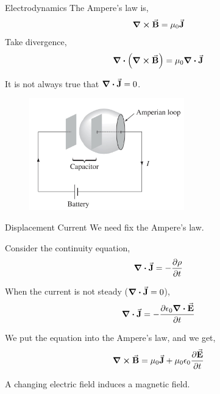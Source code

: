 \documentclass{beamer}
\begin{document}
\begin{frame}{Electrodynamics}
    The Ampere's law is,
    \begin{equation}
        \curl{\va{B}} = \mu_0 \va{J}
    \end{equation}
    Take divergence,
    \begin{equation}
        \div{\left( \curl{\va{B}} \right)} = \mu_0\div{\va{J}}
    \end{equation}

    It is not always true that $\div{\va{J}} = 0$.

    \begin{figure}[htbp]
        \centering
        \includegraphics[width=0.6\textwidth]{Images/amp.jpg}
    \end{figure}
\end{frame}

\begin{frame}{Displacement Current}
    We need fix the Ampere's law.

    Consider the continuity equation,
    \begin{equation}
        \div{\va{J}} = -\pdv{\rho}{t}
    \end{equation}

    When the current is not steady ($\div{\va{J}} = 0$),
    \begin{equation}
        \div{\va{J}} = -\pdv{\epsilon_0 \div{\va{E}}}{t}
    \end{equation}

    We put the equation into the Ampere's law, and we get,
    \begin{equation}
        \curl{\va{B}} = \mu_0 \va{J} + \mu_0 \epsilon_0\pdv{\va{E}}{t}
    \end{equation}

    A changing electric field induces a magnetic field.
\end{frame}
\end{document}
